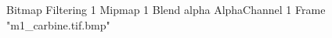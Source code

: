 {Bitmap
	{Filtering 1}
	{Mipmap 1}
	{Blend alpha}
	{AlphaChannel 1}
	{Frame "m1_carbine.tif.bmp"}
}
